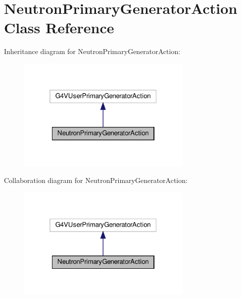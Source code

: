 \hypertarget{classNeutronPrimaryGeneratorAction}{}\section{Neutron\+Primary\+Generator\+Action Class Reference}
\label{classNeutronPrimaryGeneratorAction}


Inheritance diagram for Neutron\+Primary\+Generator\+Action\+:
\nopagebreak
\begin{figure}[H]
\begin{center}
\leavevmode
\includegraphics[width=241pt]{classNeutronPrimaryGeneratorAction__inherit__graph}
\end{center}
\end{figure}


Collaboration diagram for Neutron\+Primary\+Generator\+Action\+:
\nopagebreak
\begin{figure}[H]
\begin{center}
\leavevmode
\includegraphics[width=241pt]{classNeutronPrimaryGeneratorAction__coll__graph}
\end{center}
\end{figure}
